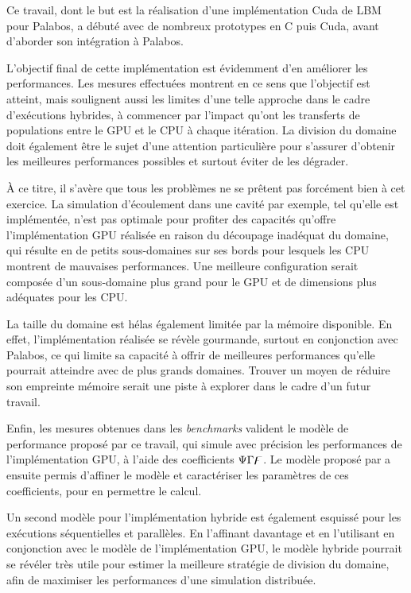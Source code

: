 Ce travail, dont le but est la réalisation d'une implémentation Cuda de \acs{LBM} pour Palabos, a débuté avec de nombreux prototypes en C puis Cuda, avant d'aborder son intégration à Palabos.

L'objectif final de cette implémentation est évidemment d'en améliorer les performances. Les mesures effectuées montrent en ce sens que l'objectif est atteint, mais soulignent aussi les limites d'une telle approche dans le cadre d'exécutions hybrides, à commencer par l'impact qu'ont les transferts de populations entre le \acs{GPU} et le \acs{CPU} à chaque itération. La division du domaine doit également être le sujet d'une attention particulière pour s'assurer d'obtenir les meilleures performances possibles et surtout éviter de les dégrader.

À ce titre, il s'avère que tous les problèmes ne se prêtent pas forcément bien à cet exercice. La simulation d'écoulement dans une cavité par exemple, tel qu'elle est implémentée, n'est pas optimale pour profiter des capacités qu'offre l'implémentation \acs{GPU} réalisée en raison du découpage inadéquat du domaine, qui résulte en de petits sous-domaines sur ses bords pour lesquels les \acs{CPU} montrent de mauvaises performances. Une meilleure configuration serait composée d'un sous-domaine plus grand pour le \acs{GPU} et de dimensions plus adéquates pour les \acs{CPU}.

La taille du domaine est hélas également limitée par la mémoire disponible. En effet, l'implémentation réalisée se révèle gourmande, surtout en conjonction avec Palabos, ce qui limite sa capacité à offrir de meilleures performances qu'elle pourrait atteindre avec de plus grands domaines. Trouver un moyen de réduire son empreinte mémoire serait une piste à explorer dans le cadre d'un futur travail.

Enfin, les mesures obtenues dans les \textit{benchmarks} valident le modèle de performance proposé par ce travail, qui simule avec précision les performances de l'implémentation \acs{GPU}, à l'aide des coefficients $\Psi\Gamma\digamma$. Le modèle proposé par \citet{albuquerque_performance_2012} a ensuite permis d'affiner le modèle et caractériser les paramètres de ces coefficients, pour en permettre le calcul. 

Un second modèle pour l'implémentation hybride est également esquissé pour les exécutions séquentielles et parallèles. En l'affinant davantage et en l'utilisant en conjonction avec le modèle de l'implémentation \acs{GPU}, le modèle hybride pourrait se révéler très utile pour estimer la meilleure stratégie de division du domaine, afin de maximiser les performances d'une simulation distribuée.